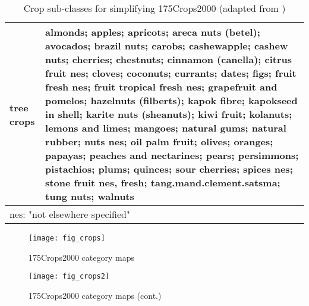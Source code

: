 \begin{table}[ht]
\begin{center}
\begin{tabular}{|p{1in}|p{4in}|}
      \hline
      tree crops &  almonds; apples; apricots; areca nuts (betel); avocados; brazil nuts; carobs; cashewapple; cashew nuts; cherries; chestnuts; cinnamon (canella); citrus fruit nes; cloves; coconuts; currants; dates; figs; fruit fresh nes; fruit tropical fresh nes; grapefruit and pomelos; hazelnuts (filberts); kapok fibre; kapokseed in shell; karite nuts (sheanuts); kiwi fruit; kolanuts; lemons and limes; mangoes; natural gums; natural rubber; nuts nes; oil palm fruit; olives; oranges; papayas; peaches and nectarines; pears; persimmons; pistachios; plums; quinces; sour cherries; spices nes; stone fruit nes, fresh; tang.mand.clement.satsma; tung nuts; walnuts \\
      \hline
      \multicolumn{2}{l}{\footnotesize nes: "not elsewhere specified"} \\
    \end{tabular}
    \caption{ Crop sub-classes for simplifying 175Crops2000 (adapted from \citet{Monfreda2008})}
    \label{tab:subclass}
  \end{center}
\end{table}


\begin{figure}[ht] 
  \centering


\texttt{[image: fig\_crops]}
\caption{175Crops2000 category maps} 
\label{fig:crops} 
\end{figure} 


\begin{figure}[ht] 
  \centering


\texttt{[image: fig\_crops2]}
\caption{175Crops2000 category maps (cont.)} 
\label{fig:crops2} 
\end{figure} 


